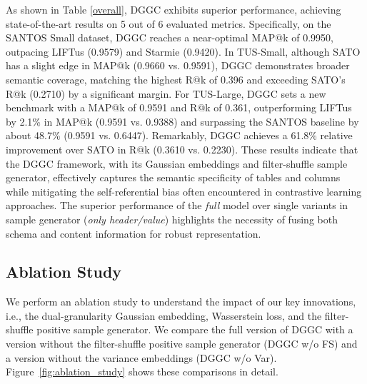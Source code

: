 As shown in Table \ref{overall}, DGGC exhibits superior performance, achieving state-of-the-art results on 5 out of 6 evaluated metrics. Specifically, on the SANTOS Small dataset, DGGC reaches a near-optimal MAP@k of 0.9950, outpacing LIFTus (0.9579) and Starmie (0.9420). In TUS-Small, although SATO has a slight edge in MAP@k (0.9660 vs. 0.9591), DGGC demonstrates broader semantic coverage, matching the highest R@k of 0.396 and exceeding SATO's R@k (0.2710) by a significant margin. For TUS-Large, DGGC sets a new benchmark with a MAP@k of 0.9591 and R@k of 0.361, outperforming LIFTus by 2.1\% in MAP@k (0.9591 vs. 0.9388) and surpassing the SANTOS baseline by about 48.7\% (0.9591 vs. 0.6447). Remarkably, DGGC achieves a 61.8\% relative improvement over SATO in R@k (0.3610 vs. 0.2230). These results indicate that the DGGC framework, with its Gaussian embeddings and filter-shuffle sample generator, effectively captures the semantic specificity of tables and columns while mitigating the self-referential bias often encountered in contrastive learning approaches. %
The superior performance of the \textit{full} model over single variants in sample generator (\textit{only header/value}) highlights the necessity of fusing both schema and content information for robust representation. %

\iffalse
\subsection{Ablation Study}
We perform an ablation study to understand the impact of our key innovations, i.e., the dual-granularity Gaussian embedding, Wasserstein loss, and the filter-shuffle positive sample generator. We compare the full version of DGGC with a version without the filter-shuffle positive sample generator (DGGC w/o FS) and a version without the variance embeddings (DGGC w/o Var). Figure~\ref{fig:ablation_study} shows these comparisons in detail.

